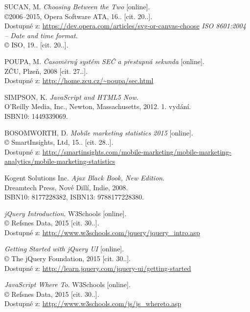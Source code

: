 \begin{flushleft}
\begin{thebibliography}{99}
		\pagebreak
		
		
			SUCAN, M. {\it Choosing Between the Two} [online].\\
			©2006--2015, Opera Software ATA, 16.. [cit. 20..].\\
			Dostupné z: \url{https://dev.opera.com/articles/svg-or-canvas-choose}
			{\it ISO 8601:2004 -- Date and time format}.\\
			© ISO, 19.. [cit. 20..].

			POUPA, M. {\it Časoměrný systém SEČ a přestupná sekunda} [online].\\
			ZČU, Plzeň, 2008 [cit. 27..].\\
			Dostupné z: \url{http://home.zcu.cz/~poupa/sec.html}
			
			SIMPSON, K. {\it JavaScript and HTML5 Now}.\\
			O'Reilly Media, Inc., Newton, Massachusetts, 2012. 1. vydání.\\
			ISBN10: 1449339069.
			
			BOSOMWORTH, D. {\it Mobile marketing statistics 2015} [online].\\
			© SmartInsights, Ltd, 15.. [cit. 28..].\\
			Dostupné z: \url{http://smartinsights.com/mobile-marketing/mobile-marketing-analytics/mobile-marketing-statistics}
			
			Kogent Solutions Inc. {\it Ajax Black Book, New Edition}.\\
			Dreamtech Press, Nové Dillí, Indie, 2008.\\
			ISBN10: 8177228382, ISBN13: 9788177228380.
			
			{\it jQuery Introduction}. W3Schools [online].\\
			© Refsnes Data, 2015 [cit. 30..].\\
			Dostupné z: \url{http://www.w3schools.com/jquery/jquery_intro.asp}
		
			{\it Getting Started with jQuery UI} [online].\\
			© The jQuery Foundation, 2015 [cit. 30..].\\
			Dostupné z: \url{http://learn.jquery.com/jquery-ui/getting-started}
			
			{\it JavaScript Where To}. W3Schools [online].\\
			© Refsnes Data, 2015 [cit. 30..].\\
			Dostupné z: \url{http://www.w3schools.com/js/js_whereto.asp}
			

\end{thebibliography}
\end{flushleft}
